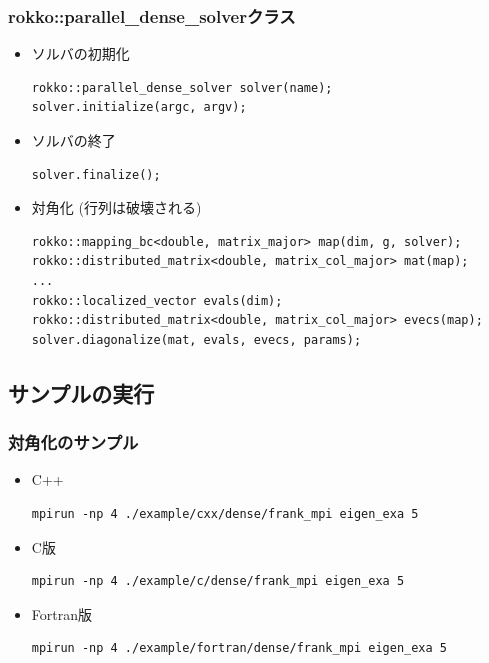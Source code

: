 \begin{frame}[c,fragile]
  \frametitle{rokko::parallel_dense_solverクラス}
  \begin{itemize}
  \item ソルバの初期化
\begin{lstlisting}
rokko::parallel_dense_solver solver(name);
solver.initialize(argc, argv);
\end{lstlisting}
  \item ソルバの終了
\begin{lstlisting}
solver.finalize();
\end{lstlisting}
  \item 対角化 (行列は破壊される)
\begin{lstlisting}
rokko::mapping_bc<double, matrix_major> map(dim, g, solver);
rokko::distributed_matrix<double, matrix_col_major> mat(map);
...
rokko::localized_vector evals(dim);
rokko::distributed_matrix<double, matrix_col_major> evecs(map);
solver.diagonalize(mat, evals, evecs, params);
\end{lstlisting}
  \end{itemize}
\end{frame}

\subsection*{サンプルの実行}

\begin{frame}[c,fragile]
  \frametitle{対角化のサンプル}
  \begin{itemize}
  \item C++ 
\begin{lstlisting}[style=shstyle]
mpirun -np 4 ./example/cxx/dense/frank_mpi eigen_exa 5
\end{lstlisting}
  \item C版 
\begin{lstlisting}[style=shstyle]
mpirun -np 4 ./example/c/dense/frank_mpi eigen_exa 5
\end{lstlisting}
  \item Fortran版 
\begin{lstlisting}[style=shstyle]
mpirun -np 4 ./example/fortran/dense/frank_mpi eigen_exa 5
\end{lstlisting}

\end{itemize}
\end{frame}


